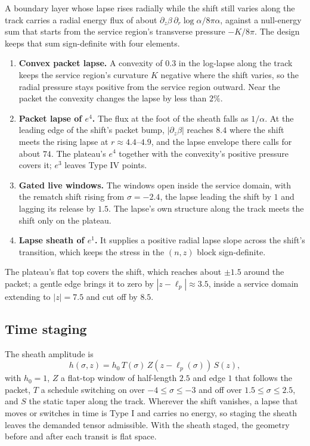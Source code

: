 \documentclass[11pt]{article}
\newcommand{\sig}{\sigma}
\begin{document}
A boundary layer whose lapse rises radially while the shift still varies along the track carries a radial energy flux of about $\partial_z\beta\,\partial_r\log\alpha/8\pi\alpha$, against a null-energy sum that starts from the service region's transverse pressure $-K/8\pi$. The design keeps that sum sign-definite with four elements.
\begin{enumerate}
\item \textbf{Convex packet lapse.} A convexity of $0.3$ in the log-lapse along the track keeps the service region's curvature $K$ negative where the shift varies, so the radial pressure stays positive from the service region outward. Near the packet the convexity changes the lapse by less than $2\%$.
\item \textbf{Packet lapse of $e^{4}$.} The flux at the foot of the sheath falls as $1/\alpha$. At the leading edge of the shift's packet bump, $|\partial_z\beta|$ reaches $8.4$ where the shift meets the rising lapse at $r\approx4.4$--$4.9$, and the lapse envelope there calls for about $74$. The plateau's $e^{4}$ together with the convexity's positive pressure covers it; $e^{3}$ leaves Type IV points.
\item \textbf{Gated live windows.} The windows open inside the service domain, with the rematch shift rising from $\sig=-2.4$, the lapse leading the shift by $1$ and lagging its release by $1.5$. The lapse's own structure along the track meets the shift only on the plateau.
\item \textbf{Lapse sheath of $e^{1}$.} It supplies a positive radial lapse slope across the shift's transition, which keeps the stress in the $(n,z)$ block sign-definite.
\end{enumerate}
The plateau's flat top covers the shift, which reaches about $\pm1.5$ around the packet; a gentle edge brings it to zero by $|z-\ell_p|\approx3.5$, inside a service domain extending to $|z|=7.5$ and cut off by $8.5$.

\subsection{Time staging}

The sheath amplitude is
\begin{equation}
h(\sig,z)=h_0\,T(\sig)\,Z\!\left(z-\ell_p(\sig)\right)\,S(z),
\end{equation}
with $h_0=1$, $Z$ a flat-top window of half-length $2.5$ and edge $1$ that follows the packet, $T$ a schedule switching on over $-4\le\sig\le-3$ and off over $1.5\le\sig\le2.5$, and $S$ the static taper along the track. Wherever the shift vanishes, a lapse that moves or switches in time is Type I and carries no energy, so staging the sheath leaves the demanded tensor admissible. With the sheath staged, the geometry before and after each transit is flat space.
\end{document}
